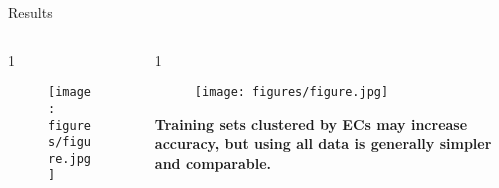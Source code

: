 \documentclass[final]{beamer}
\newlength{\onecolwid}
\newlength{\twocolwid}
\begin{document}
\begin{frame}[t]
\begin{columns}[t]
\begin{column}{\twocolwid}
\begin{block}{Results}
\begin{columns}[t,totalwidth=\twocolwid]
\begin{column}{1\onecolwid} %


\begin{figure}
  \texttt{[image: figures/figure.jpg]}
\end{figure}


\end{column} %




\begin{column}{1\onecolwid} %



\begin{figure}
  \texttt{[image: figures/figure.jpg]}
\end{figure}

\vspace{0.5cm}

\begin{footnotesize}

\textbf{Training sets clustered by ECs may increase accuracy, but using all data is generally simpler and comparable.}

\end{footnotesize}




\end{column} %

\end{columns} %





\vspace{1cm}


\end{block}




\begin{columns}[t,totalwidth=\twocolwid] %



\end{columns}
\end{column}
\end{columns}
\end{frame}
\end{document}
